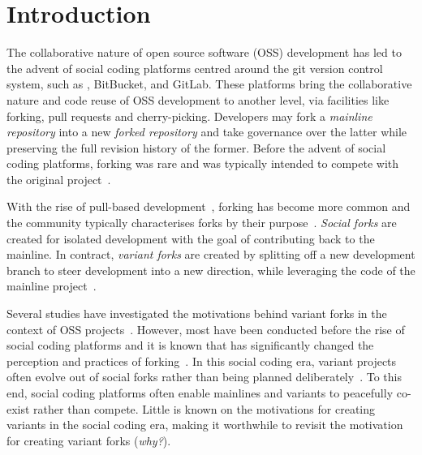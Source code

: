 \section{Introduction}
\label{sec:intro}

The collaborative nature of open source software (OSS) development has led to the advent of social coding platforms centred around the git version control system, such as \gh, BitBucket, and GitLab.
These platforms bring the collaborative nature and code reuse of OSS development to another level, via facilities like forking, pull requests and cherry-picking.
Developers may fork a \textit{mainline repository} into a new \textit{forked repository} and take governance over the latter while preserving the full revision history of the former.
Before the advent of social coding platforms, forking was rare and was typically intended to compete with the original project~\cite{Linus:2012Perspectives,Gregorio:2012,Viseur:2012Forks,Linus:2013CodeForking,Linus:2011ToFork,Gamalielsson:2014Sustainability}.

With the rise of pull-based development~\cite{Gousios:2014ICSE}, forking has become more common and the community typically characterises forks by their purpose~\cite{Zhou:2020}.
\textit{Social forks} are created for isolated development with the goal of contributing back to the mainline.
In contract, \textit{variant forks} are created by splitting off a new development branch
to steer development into a new direction, while leveraging the code of the mainline project~\cite{sung:ICSE:2020}.

Several studies have investigated the motivations behind variant forks in the context of OSS projects~\cite{Linus:2012Perspectives,Gregorio:2012,Viseur:2012Forks,Linus:2013CodeForking,Linus:2011ToFork,Gamalielsson:2014Sustainability}.
However, most have been conducted before the rise of social coding platforms and it is known that \gh has significantly changed the perception and practices of forking~\cite{Zhou:2020}.
In this social coding era, variant projects often evolve out of social forks rather than being planned deliberately~\cite{Zhou:2020}.
To this end, social coding platforms often enable mainlines and variants to peacefully co-exist rather than compete.
Little is known on the motivations for creating variants in the social coding era, making it worthwhile
to revisit the motivation for creating variant forks (\textit{why?}).


